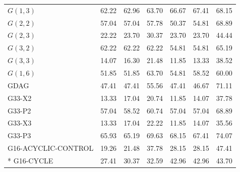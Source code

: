 \begin{longtable}{@{}lrrrrrr@{}}
\( G(1,3) \) & 62.22 & 62.96 & 63.70 & 66.67 & 67.41 & 68.15 \\
\( G(2,2) \) & 57.04 & 57.04 & 57.78 & 50.37 & 54.81 & 68.89 \\
\( G(2,3) \) & 22.22 & 23.70 & 30.37 & 23.70 & 23.70 & 44.44 \\
\( G(3,2) \) & 62.22 & 62.22 & 62.22 & 54.81 & 54.81 & 65.19 \\
\( G(3,3) \) & 14.07 & 16.30 & 21.48 & 11.85 & 13.33 & 38.52 \\
\( G(1,6) \) & 51.85 & 51.85 & 63.70 & 54.81 & 58.52 & 60.00 \\
GDAG & 47.41 & 47.41 & 55.56 & 47.41 & 46.67 & 71.11 \\
G33-X2 & 13.33 & 17.04 & 20.74 & 11.85 & 14.07 & 37.78 \\
G33-P2 & 57.04 & 58.52 & 60.74 & 57.04 & 57.04 & 68.89 \\
G33-X3 & 13.33 & 17.04 & 22.22 & 11.85 & 14.07 & 35.56 \\
G33-P3 & 65.93 & 65.19 & 69.63 & 68.15 & 67.41 & 74.07 \\
G16-ACYCLIC-CONTROL & 19.26 & 21.48 & 37.78 & 28.15 & 28.15 & 47.41 \\*
G16-CYCLE & 27.41 & 30.37 & 32.59 & 42.96 & 42.96 & 43.70 \\
\end{longtable}
\endgroup
